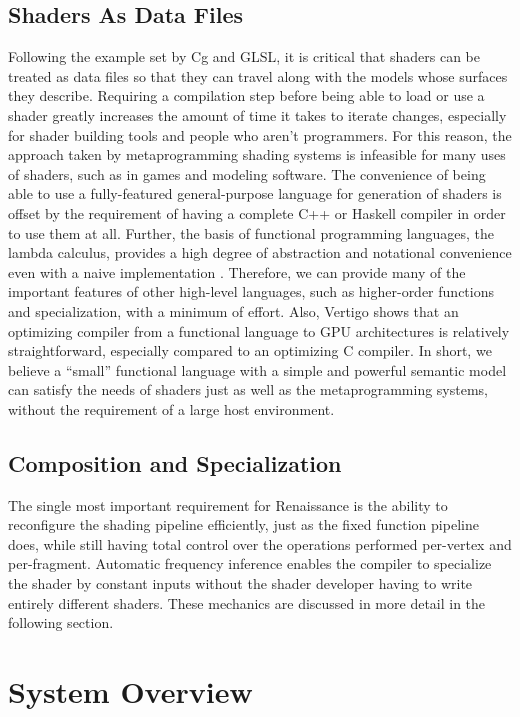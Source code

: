 \documentclass{acmsiggraph}               %
\begin{document}
\subsection{Shaders As Data Files}

Following the example set by Cg and GLSL, it is critical that shaders
can be treated as data files so that they can travel along with the
models whose surfaces they describe.  Requiring a compilation step
before being able to load or use a shader greatly increases the amount
of time it takes to iterate changes, especially for shader building
tools and people who aren't programmers.  For this reason, the
approach taken by metaprogramming shading systems is infeasible for
many uses of shaders, such as in games and modeling software.  The
convenience of being able to use a fully-featured general-purpose
language for generation of shaders is offset by the requirement of
having a complete C++ or Haskell compiler in order to use them at all.
Further, the basis of functional programming languages, the lambda
calculus, provides a high degree of abstraction and notational
convenience even with a naive implementation
\cite{PeytonFunctional}.  Therefore, we can provide many of the
important features of other high-level languages, such as higher-order
functions and specialization, with a minimum of effort.  Also, Vertigo
shows that an optimizing compiler from a functional language to GPU
architectures is relatively straightforward, especially compared to an
optimizing C compiler.  In short, we believe a ``small'' functional
language with a simple and powerful semantic model can satisfy the
needs of shaders just as well as the metaprogramming systems, without
the requirement of a large host environment.


\subsection{Composition and Specialization}

The single most important requirement for Renaissance is the ability
to reconfigure the shading pipeline efficiently, just as the fixed
function pipeline does, while still having total control over the
operations performed per-vertex and per-fragment.  Automatic frequency
inference enables the compiler to specialize the shader by constant
inputs without the shader developer having to write entirely different
shaders.  These mechanics are discussed in more detail in the
following section.


\section{System Overview}
\end{document}
